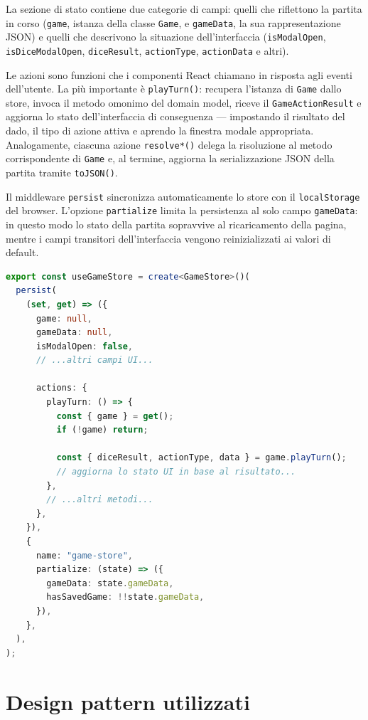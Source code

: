 \documentclass[12pt]{report}
\begin{document}
La sezione di stato contiene due categorie di campi: quelli che riflettono la partita in corso (\texttt{game}, istanza della classe \texttt{Game}, e \texttt{gameData}, la sua rappresentazione JSON) e quelli che descrivono la situazione dell'interfaccia (\texttt{isModalOpen}, \texttt{isDiceModalOpen}, \texttt{diceResult}, \texttt{actionType}, \texttt{actionData} e altri).

Le azioni sono funzioni che i componenti React chiamano in risposta agli eventi dell'utente. La più importante è \texttt{playTurn()}: recupera l'istanza di \texttt{Game} dallo store, invoca il metodo omonimo del domain model, riceve il \texttt{GameActionResult} e aggiorna lo stato dell'interfaccia di conseguenza --- impostando il risultato del dado, il tipo di azione attiva e aprendo la finestra modale appropriata. Analogamente, ciascuna azione \texttt{resolve*()} delega la risoluzione al metodo corrispondente di \texttt{Game} e, al termine, aggiorna la serializzazione JSON della partita tramite \texttt{toJSON()}.

Il middleware \texttt{persist} sincronizza automaticamente lo store con il \texttt{localStorage} del browser. L'opzione \texttt{partialize} limita la persistenza al solo campo \texttt{gameData}: in questo modo lo stato della partita sopravvive al ricaricamento della pagina, mentre i campi transitori dell'interfaccia vengono reinizializzati ai valori di default.

\begin{lstlisting}[language=TypeScript, caption={Store di gioco con persistenza selettiva (src/store/game-store.ts)}]
export const useGameStore = create<GameStore>()(
  persist(
    (set, get) => ({
      game: null,
      gameData: null,
      isModalOpen: false,
      // ...altri campi UI...

      actions: {
        playTurn: () => {
          const { game } = get();
          if (!game) return;

          const { diceResult, actionType, data } = game.playTurn();
          // aggiorna lo stato UI in base al risultato...
        },
        // ...altri metodi...
      },
    }),
    {
      name: "game-store",
      partialize: (state) => ({
        gameData: state.gameData,
        hasSavedGame: !!state.gameData,
      }),
    },
  ),
);
\end{lstlisting}

\section{Design pattern utilizzati}
\end{document}
